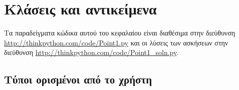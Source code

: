 \documentclass[10pt]{book}
\begin{document}









 
\chapter{Κλάσεις και αντικείμενα}

Τα παραδείγματα κώδικα αυτού του κεφαλαίου είναι διαθέσιμα στην διεύθυνση  
\url{http://thinkpython.com/code/Point1.py}  και οι λύσεις των ασκήσεων στην διεύθυνση  
\url{http://thinkpython.com/code/Point1_soln.py}.


 
\section{Τύποι ορισμένοι από το χρήστη}
\label{point}
\end{document}
